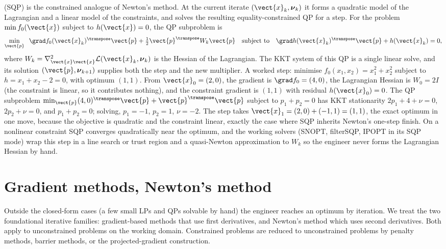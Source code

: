  (SQP) is the constrained
analogue of Newton's method. At the current iterate $(\vect{x}_{k},
\boldsymbol{\nu}_{k})$ it forms a quadratic model of the Lagrangian
and a linear model of the constraints, and solves the resulting
equality-constrained QP for a step. For the problem $\min f_{0}
(\vect{x})$ subject to $h(\vect{x}) = 0$, the QP subproblem is
\[
\min_{\vect{p}} \;\; \grad f_{0}(\vect{x}_{k})^{\transpose} \vect{p}
+ \tfrac{1}{2} \vect{p}^{\transpose} W_{k} \vect{p}
\quad \text{subject to} \quad
\grad h(\vect{x}_{k})^{\transpose} \vect{p} + h(\vect{x}_{k}) = 0,
\]
where $W_{k} = \nabla^{2}_{\vect{x}\vect{x}} \mathcal{L}(\vect{x}_{k},
\boldsymbol{\nu}_{k})$ is the Hessian of the Lagrangian. The KKT
system of this QP is a single linear solve, and its solution
$(\vect{p}, \boldsymbol{\nu}_{k+1})$ supplies both the step and the
new multiplier. A worked step: minimise $f_{0}(x_{1}, x_{2}) =
x_{1}^{2} + x_{2}^{2}$ subject to $h = x_{1} + x_{2} - 2 = 0$, with
optimum $(1, 1)$. From $\vect{x}_{0} = (2, 0)$, the gradient is
$\grad f_{0} = (4, 0)$, the Lagrangian Hessian is $W_{0} = 2 I$ (the
constraint is linear, so it contributes nothing), and the constraint
gradient is $(1, 1)$ with residual $h(\vect{x}_{0}) = 0$. The QP
subproblem $\min_{\vect{p}} (4, 0)^{\transpose} \vect{p} +
\vect{p}^{\transpose} \vect{p}$ subject to $p_{1} + p_{2} = 0$ has
KKT stationarity $2 p_{1} + 4 + \nu = 0$, $2 p_{2} + \nu = 0$, and
$p_{1} + p_{2} = 0$; solving, $p_{1} = -1$, $p_{2} = 1$, $\nu = -2$.
The step takes $\vect{x}_{1} = (2, 0) + (-1, 1) = (1, 1)$, the exact
optimum in one move, because the objective is quadratic and the
constraint linear, exactly the case where SQP inherits Newton's
one-step finish. On a nonlinear constraint SQP converges
quadratically near the optimum, and the working solvers (SNOPT,
filterSQP, IPOPT in its SQP mode) wrap this step in a line search
or trust region and a quasi-Newton approximation to $W_{k}$ so the
engineer never forms the Lagrangian Hessian by hand.

\section{Gradient methods, Newton's method}

Outside the closed-form cases (a few small LPs and QPs solvable
by hand) the engineer reaches an optimum by iteration. We treat
the two foundational iterative families: gradient-based methods
that use first derivatives, and Newton's method which uses second
derivatives. Both apply to unconstrained problems on the working
domain. Constrained problems are reduced to unconstrained
problems by penalty methods, barrier methods, or the
projected-gradient construction.

